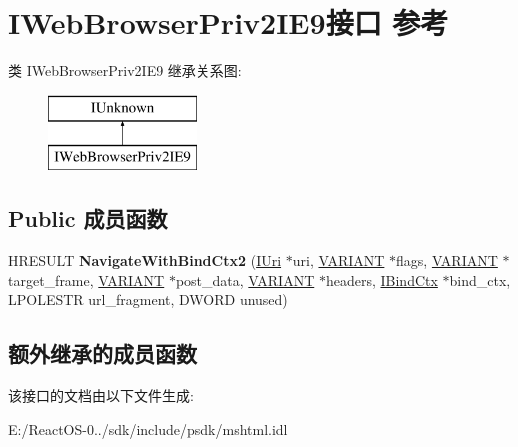 \hypertarget{interface_i_web_browser_priv2_i_e9}{}\section{I\+Web\+Browser\+Priv2\+I\+E9接口 参考}
\label{interface_i_web_browser_priv2_i_e9}
类 I\+Web\+Browser\+Priv2\+I\+E9 继承关系图\+:\begin{figure}[H]
\begin{center}
\leavevmode
\includegraphics[height=2.000000cm]{interface_i_web_browser_priv2_i_e9}
\end{center}
\end{figure}
\subsection*{Public 成员函数}
\begin{DoxyCompactItemize}
\item 
\mbox{\label{interface_i_web_browser_priv2_i_e9_a5466e71321f452d84003b0b40e3f24ee}} 
H\+R\+E\+S\+U\+LT {\bfseries Navigate\+With\+Bind\+Ctx2} (\hyperlink{interface_i_uri}{I\+Uri} $\ast$uri, \hyperlink{structtag_v_a_r_i_a_n_t}{V\+A\+R\+I\+A\+NT} $\ast$flags, \hyperlink{structtag_v_a_r_i_a_n_t}{V\+A\+R\+I\+A\+NT} $\ast$target\+\_\+frame, \hyperlink{structtag_v_a_r_i_a_n_t}{V\+A\+R\+I\+A\+NT} $\ast$post\+\_\+data, \hyperlink{structtag_v_a_r_i_a_n_t}{V\+A\+R\+I\+A\+NT} $\ast$headers, \hyperlink{interface_i_bind_ctx}{I\+Bind\+Ctx} $\ast$bind\+\_\+ctx, L\+P\+O\+L\+E\+S\+TR url\+\_\+fragment, D\+W\+O\+RD unused)
\end{DoxyCompactItemize}
\subsection*{额外继承的成员函数}


该接口的文档由以下文件生成\+:\begin{DoxyCompactItemize}
\item 
E\+:/\+React\+O\+S-\/0../sdk/include/psdk/mshtml.\+idl\end{DoxyCompactItemize}
